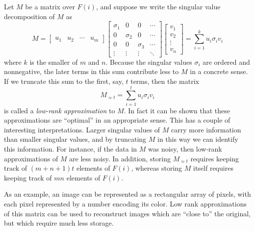 \documentclass{memoir}
\begin{document}
Let $M$ be a matrix over $F(i)$, and suppose we write the singular value decomposition of $M$ as \[ M = \left[ \begin{array}{c|c|c|c} u_1 & u_2 & \cdots & u_m \end{array}\right] \begin{bmatrix} \sigma_1 & 0 & 0 & \cdots \\ 0 & \sigma_2 & 0 & \cdots \\ 0 & 0 & \sigma_3 & \cdots \\ \vdots & \vdots & \vdots & \ddots \end{bmatrix} \left[ \begin{array}{c} v_1 \\ \hline v_2 \\ \hline \vdots \\ \hline v_n \end{array} \right] = \sum_{i=1}^k u_i \sigma_i v_i \] where $k$ is the smaller of $m$ and $n$. Because the singular values $\sigma_i$ are ordered and nonnegative, the later terms in this sum contribute less to $M$ in a concrete sense. If we truncate this sum to the first, say, $t$ terms, then the matrix \[ M_{\approx t} = \sum_{i=1}^t u_i \sigma_i v_i \] is called a \emph{low-rank approximation} to $M$. In fact it can be shown that these approximations are ``optimal'' in an appropriate sense. This has a couple of interesting interpretations. Larger singular values of $M$ carry more information than smaller singular values, and by truncating $M$ in this way we can identify this information. For instance, if the data in $M$ was noisy, then low-rank approximations of $M$ are less noisy. In addition, storing $M_{\approx t}$ requires keeping track of $(m+n+1)t$ elements of $F(i)$, whereas storing $M$ itself requires keeping track of $mn$ elements of $F(i)$.

As an example, an image can be represented as a rectangular array of pixels, with each pixel represented by a number encoding its color. Low rank approximations of this matrix can be used to reconstruct images which are ``close to'' the original, but which require much less storage.
\end{document}
